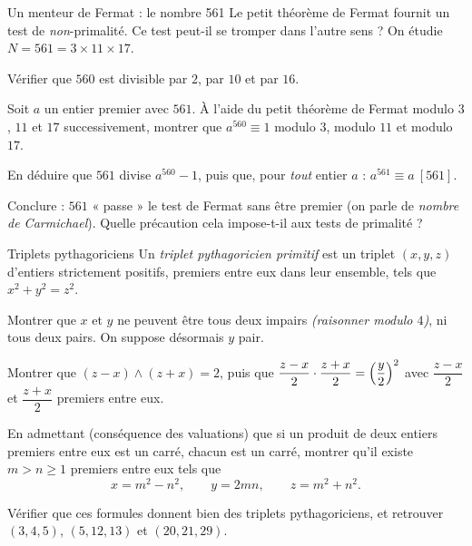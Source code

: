 \begin{exercice}[3]{Un menteur de Fermat : le nombre 561}
Le petit théorème de Fermat fournit un test de \emph{non}-primalité. Ce test
peut-il se tromper dans l'autre sens ? On étudie $N=561=3\times11\times17$.
\begin{questions}
  \item Vérifier que $560$ est divisible par $2$, par $10$ et par $16$.
  \item Soit $a$ un entier premier avec $561$. À l'aide du petit théorème
    de Fermat modulo $3$, $11$ et $17$ successivement, montrer que
    $a^{560}\equiv1$ modulo $3$, modulo $11$ et modulo $17$.
  \item En déduire que $561$ divise $a^{560}-1$, puis que, pour \emph{tout}
    entier $a$ : $a^{561}\equiv a\ [561]$.
  \item Conclure : $561$ « passe » le test de Fermat sans être premier (on
    parle de \emph{nombre de Carmichael}). Quelle précaution cela
    impose-t-il aux tests de primalité ?
\end{questions}
\end{exercice}

\begin{exercice}[3]{Triplets pythagoriciens}
Un \emph{triplet pythagoricien primitif} est un triplet $(x,y,z)$ d'entiers
strictement positifs, premiers entre eux dans leur ensemble, tels que
$x^{2}+y^{2}=z^{2}$.
\begin{questions}
  \item Montrer que $x$ et $y$ ne peuvent être tous deux impairs
    \emph{(raisonner modulo $4$)}, ni tous deux pairs. On suppose désormais
    $y$ pair.
  \item Montrer que $(z-x)\wedge(z+x)=2$, puis que
    $\dfrac{z-x}{2}\cdot\dfrac{z+x}{2}=\Bigl(\dfrac{y}{2}\Bigr)^{2}$ avec
    $\dfrac{z-x}{2}$ et $\dfrac{z+x}{2}$ premiers entre eux.
  \item En admettant (conséquence des valuations) que si un produit de deux
    entiers premiers entre eux est un carré, chacun est un carré, montrer
    qu'il existe $m>n\geq1$ premiers entre eux tels que
    \[
      x=m^{2}-n^{2},\qquad y=2mn,\qquad z=m^{2}+n^{2}.
    \]
  \item Vérifier que ces formules donnent bien des triplets
    pythagoriciens, et retrouver $(3,4,5)$, $(5,12,13)$ et $(20,21,29)$.
\end{questions}
\end{exercice}


